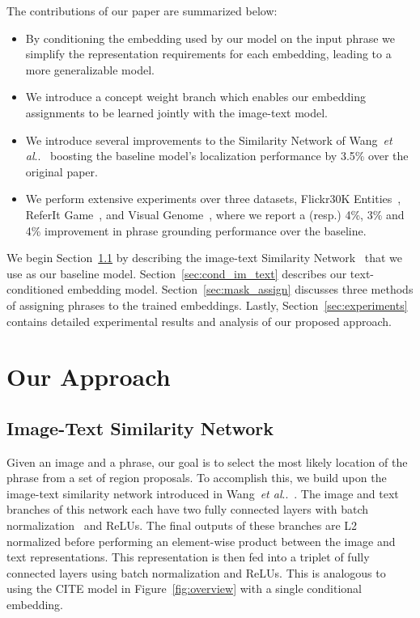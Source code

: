 \documentclass[runningheads]{llncs}
\makeatletter
\DeclareRobustCommand\onedot{\futurelet\@let@token\@onedot}
\def\@onedot{\ifx\@let@token.\else.\null\fi\xspace}
\def\etal{\emph{et al}\onedot}
\makeatother
\begin{document}
The contributions of our paper are summarized below:

\begin{itemize}
\item By conditioning the embedding used by our model on the input phrase we simplify the representation requirements for each embedding, leading to a more generalizable model.
\item We introduce a concept weight branch which enables our embedding assignments to be learned jointly with the image-text model.
\item We introduce several improvements to the Similarity Network of Wang~\etal~\cite{wangTwoBranch2017} boosting the baseline model's localization performance by 3.5\% over the original paper.
\item We perform extensive experiments over three datasets, Flickr30K Entities~\cite{flickrentitiesijcv}, ReferIt Game~\cite{kazemzadeh-EtAl:2014:EMNLP2014}, and Visual Genome~\cite{krishnavisualgenome}, where we report a (resp.) 4\%, 3\% and 4\% improvement in phrase grounding performance over the baseline.
\end{itemize}

We begin Section~\ref{sec:image-text_embed} by describing the image-text Similarity Network~\cite{wangTwoBranch2017} that we use as our baseline model.  Section~\ref{sec:cond_im_text} describes our text-conditioned embedding model.  Section~\ref{sec:mask_assign} discusses three methods of assigning phrases to the trained embeddings.  Lastly, Section~\ref{sec:experiments} contains detailed experimental results and analysis of our proposed approach.


\section{Our Approach}\subsection{Image-Text Similarity Network}\label{sec:image-text_embed}
Given an image and a phrase, our goal is to select the most likely location of the phrase from a set of region proposals.  To accomplish this, we build upon the image-text similarity network introduced in Wang~\etal~\cite{wangTwoBranch2017}.  The image and text branches of this network each have two fully connected layers with batch normalization~\cite{Ioffe:2015:BNA:3045118.3045167} and ReLUs.  The final outputs of these branches are L2 normalized before performing an element-wise product between the image and text representations.  This representation is then fed into a triplet of fully connected layers using batch normalization and ReLUs.  This is analogous to using the CITE model in Figure~\ref{fig:overview} with a single conditional embedding.
\end{document}
